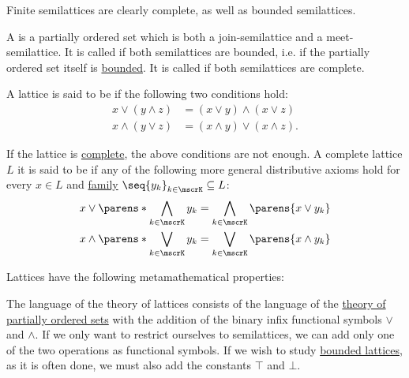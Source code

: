\begin{definition}
\begin{thmenum}[series=def:semilattice]
    Finite semilattices are clearly complete, as well as bounded semilattices.

     A  is a partially ordered set which is both a join-semilattice and a meet-semilattice. It is called  if both semilattices are bounded, i.e. if the partially ordered set itself is \hyperref[def:partially_ordered_set_extremal_points/top_and_bottom]{bounded}. It is called  if both semilattices are complete.

     A lattice is said to be  if the following two conditions hold:
    \begin{align}
      x \vee (y \wedge z) &= (x \vee y) \wedge (x \vee z) \label{eq:def:semilattice/distributive_lattice/finite/join_over_meet} \\
      x \wedge (y \vee z) &= (x \wedge y) \vee (x \wedge z) \label{eq:def:semilattice/distributive_lattice/finite/meet_over_join}.
    \end{align}

    If the lattice is \hyperref[def:semilattice/complete]{complete}, the above conditions are not enough. A complete lattice \( L \) it is said to be  if any of the following more general distributive axioms hold for every \( x \in L \) and \hyperref[def:cartesian_product/indexed_family]{family} \( \seq{ y_k }_{k \in \mscrK} \subseteq L \):
    \begin{align}
      x \vee \parens*{ \bigwedge_{k \in \mscrK} y_k } &= \bigwedge_{k \in \mscrK} \parens{ x \vee y_k } \label{eq:def:semilattice/distributive_lattice/arbitrary/join_over_meet} \\
      x \wedge \parens*{ \bigvee_{k \in \mscrK} y_k } &= \bigvee_{k \in \mscrK} \parens{ x \wedge y_k } \label{eq:def:semilattice/distributive_lattice/arbitrary/meet_over_join}
    \end{align}
  \end{thmenum}

  Lattices have the following metamathematical properties:
  \begin{thmenum}[resume=def:semilattice]
     The language of the theory of lattices consists of the language of the \hyperref[def:partially_ordered_set/theory]{theory of partially ordered sets} with the addition of the binary infix functional symbols \( \vee \) and \( \wedge \). If we only want to restrict ourselves to semilattices, we can add only one of the two operations as functional symbols. If we wish to study \hyperref[def:semilattice/bounded]{bounded lattices}, as it is often done, we must also add the constants \( \top \) and \( \bot \).


\end{thmenum}
\end{definition}
